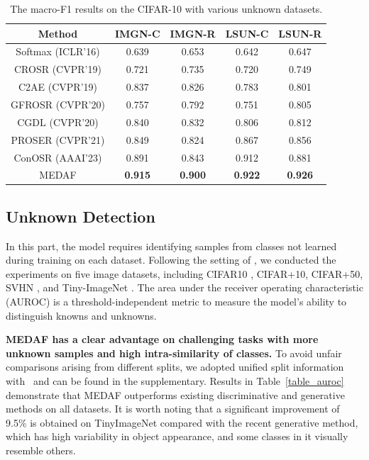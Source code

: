 \documentclass[letterpaper]{article} %
\begin{document}
\begin{table}[!ht]
\centering
\small
\setlength\tabcolsep{3pt}
\begin{tabular}{ccccc}
    \hline
    Method & IMGN-C & IMGN-R & LSUN-C & LSUN-R  \\ \hline
    Softmax (ICLR'16)& 0.639 & 0.653 & 0.642 & 0.647  \\
    CROSR (CVPR'19)& 0.721 & 0.735 & 0.720 & 0.749  \\
    C2AE (CVPR'19)& 0.837 & 0.826 & 0.783 & 0.801  \\
    GFROSR (CVPR'20)& 0.757 & 0.792 & 0.751 & 0.805  \\
    CGDL (CVPR'20)& 0.840 & 0.832 & 0.806 & 0.812  \\
    PROSER (CVPR'21)& 0.849 & 0.824 & 0.867 & 0.856  \\
    ConOSR (AAAI'23)& 0.891 & 0.843 & 0.912 & 0.881  \\ \hline
    MEDAF & \textbf{0.915} & \textbf{0.900} & \textbf{0.922} & \textbf{0.926}  \\ \hline
\end{tabular}
\caption{The macro-F1 results on the CIFAR-10 with various unknown datasets.}
\label{table_f1}
\end{table}
\subsection{Unknown Detection}
In this part, the model requires identifying samples from classes not learned during training on each dataset. Following the setting of \cite{moon2022difficulty}, we conducted the experiments on five image datasets, including CIFAR10 \cite{krizhevsky09learning}, CIFAR+10, CIFAR+50, SVHN \cite{netzer2011reading}, and Tiny-ImageNet \cite{pouransari2014tiny}. The area under the receiver operating characteristic (AUROC) is a threshold-independent metric to measure the model's ability to distinguish knowns and unknowns.

\textbf{MEDAF has a clear advantage on challenging tasks with more unknown samples and high intra-similarity of classes.}
To avoid unfair comparisons arising from different splits, we adopted unified split information with~\cite{moon2022difficulty,neal2018open} and can be found in the supplementary. Results in Table~\ref{table_auroc} demonstrate that MEDAF outperforms existing discriminative and generative methods on all datasets. It is worth noting that a significant improvement of 9.5\% is obtained on TinyImageNet compared with the recent generative method, which has high variability in object appearance, and some classes in it visually resemble others.
\end{document}
